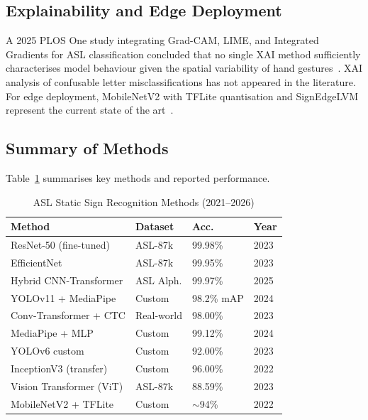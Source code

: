 \documentclass[conference]{IEEEtran}
\begin{document}
\subsection{Explainability and Edge Deployment}

A 2025 PLOS One study integrating Grad-CAM, LIME, and Integrated Gradients for
ASL classification concluded that no single XAI method sufficiently characterises
model behaviour given the spatial variability of hand gestures~\cite{naz2025}.
XAI analysis of confusable letter misclassifications has not appeared in the
literature. For edge deployment, MobileNetV2 with TFLite quantisation and
SignEdgeLVM represent the current state of the art~\cite{alam2024,signeEdgeLVM2025}.

\subsection{Summary of Methods}

Table~\ref{tab:methods} summarises key methods and reported performance.

\begin{table}[htbp]
\caption{ASL Static Sign Recognition Methods (2021--2026)}
\label{tab:methods}
\centering
\renewcommand{\arraystretch}{1.15}
\begin{tabular}{p{2.7cm} p{1.5cm} p{1.1cm} p{0.7cm}}
\toprule
\textbf{Method} & \textbf{Dataset} & \textbf{Acc.} & \textbf{Year} \\
\midrule
ResNet-50 (fine-tuned)     & ASL-87k    & 99.98\%    & 2023 \\
EfficientNet               & ASL-87k    & 99.95\%    & 2023 \\
Hybrid CNN-Transformer     & ASL Alph.  & 99.97\%    & 2025 \\
YOLOv11 + MediaPipe        & Custom     & 98.2\% mAP & 2024 \\
Conv-Transformer + CTC     & Real-world & 98.00\%    & 2023 \\
MediaPipe + MLP            & Custom     & 99.12\%    & 2024 \\
YOLOv6 custom              & Custom     & 92.00\%    & 2023 \\
InceptionV3 (transfer)     & Custom     & 96.00\%    & 2022 \\
Vision Transformer (ViT)   & ASL-87k    & 88.59\%    & 2023 \\
MobileNetV2 + TFLite       & Custom     & $\sim$94\% & 2022 \\
\bottomrule
\end{tabular}
\end{table}
\end{document}

